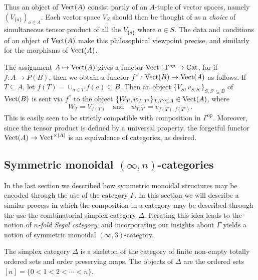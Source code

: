\documentclass{amsart}
\begin{document}
Thus an object of $\mathrm{Vect}(A)$ consist partly of an $A$-tuple of vector spaces, namely $ (V_{\{a\}})_{a \in A}$. Each vector space $V_S$ should then be thought of as a {\em choice} of simultaneous tensor product of all the $V_{\{a\}}$ where $a \in S$. The data and conditions of an object of $\mathrm{Vect}(A)$ make this philosophical viewpoint precise, and similarly for the morphisms of $\mathrm{Vect}(A)$. 

The assignment $A \mapsto \mathrm{Vect}(A)$ gives a functor $\mathrm{Vect}: \Gamma^{op} \to \mathrm{Cat}$, for if $f: A \to P(B)$, then we obtain a functor $f^*: \mathrm{Vect}(B) \to \mathrm{Vect}(A)$ as follows. If $T \subseteq A$, let $f(T) = \cup_{a \in T} f(a) \subseteq B$. Then an object $\{ V_S, v_{S,S'} \}_{S, S' \subseteq B}$ of $\mathrm{Vect}(B)$ is sent via $f^*$ to the object $\{ W_T, w_{T, T'} \}_{T, T' \subseteq A} \in \mathrm{Vect}(A)$, where 
\begin{equation*}
	W_T = V_{f(T)} \quad \textrm{and} \quad  w_{T, T'} = v_{f(T), f(T')}.
\end{equation*}
This is easily seen to be strictly compatible with composition in $\Gamma^\text{op}$. Moreover, since the tensor product is defined by a universal property, the forgetful functor $\mathrm{Vect}(A) \to \mathrm{Vect}^{\times |A|}$ is an equivalence of categories, as desired.  


\subsection{Symmetric monoidal $(\infty,n)$-categories}


In the last section we described how symmetric monoidal structures may be encoded through the use of the category $\Gamma$. In this section we will describe a similar process in which the composition in a category may be described through the use the combinatorial simplex category $\Delta$. Iterating this idea leads to the notion of {\em $n$-fold Segal category}, and incorporating our insights about $\Gamma$ yields a notion of symmetric monoidal $(\infty,3)$-category.  

\begin{definition}
	The simplex category $\Delta$ is a skeleton of the category of finite non-empty totally ordered sets and order preserving maps. The objects of $\Delta$ are the ordered sets $[n] = \{ 0 < 1 < 2 < \cdots < n\}$. 
\end{definition}
\end{document}
